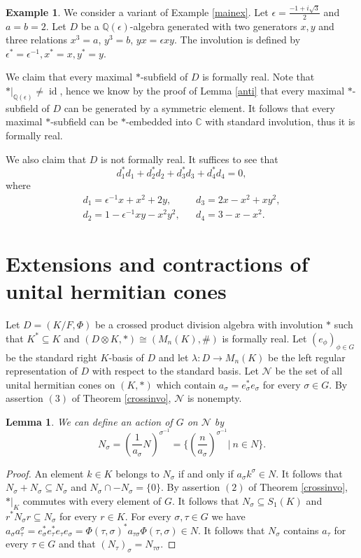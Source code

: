 \documentclass[12pt,reqno]{amsart}
\newtheorem{lem}[thm]{Lemma}
\theoremstyle{definition}
\newtheorem{ex}{Example}
\providecommand{\CC}{\mathbb{C}}
\providecommand{\QQ}{\mathbb{Q}}
\providecommand{\eps}{\epsilon}
\DeclareMathOperator{\id}{id}
\begin{document}
\begin{ex} 
\label{mainexvar}
We consider a variant of Example \ref{mainex}. Let $\epsilon = \frac{-1+i\sqrt{3}}{2}$
and $a=b=2$. Let $D$ be a $\QQ(\eps)$-algebra generated with two generators $x, y$ 
and three relations $x^3=a$, $y^3=b$, $yx=\epsilon xy$. 
The involution is defined by $\eps^\ast=\eps^{-1},x^\ast=x,y^\ast=y$. 

We claim that every maximal $\ast$-subfield of $D$ is formally real. Note that 
$\ast|_{\QQ(\eps)} \ne \id$, hence we know by the proof of Lemma \ref{anti}
that every maximal $\ast$-subfield of $D$ can be generated by a symmetric element.
It follows that every maximal $\ast$-subfield can be $\ast$-embedded into
$\CC$ with standard involution, thus it is formally real.

We also claim that $D$ is not formally real. It suffices to see that
\[
d_1^\ast d_1+d_2^\ast d_2+d_3^\ast d_3+d_4^\ast d_4=0,
\]
where
\[
\begin{array}{lll}
d_1 = \eps^{-1} x+x^2+ 2 y, & & d_3 = 2x-x^2+x y^2, \\
d_2 = 1- \eps^{-1} x y - x^2 y^2, & & d_4 = 3-x-x^2.
\end{array}
\]
\end{ex}



\section{Extensions and contractions of unital hermitian cones}


Let $D=(K/F,\Phi)$ be a crossed product division algebra with involution $\ast$
such that $K^\ast \subseteq K$ and $(D \otimes K,\ast) \cong (M_n(K),\#)$ is formally real. 
Let $(e_\phi)_{\phi \in G}$ be the standard right $K$-basis of $D$ and let 
$\lambda \colon D \to M_n(K)$ be the left regular representation of $D$ with respect to 
the standard basis. Let $\mathcal{N}$ be the set of all unital hermitian cones on $(K,\ast)$ 
which contain $a_\sigma = e_\sigma^\ast e_\sigma$ for every $\sigma \in G$. 
By assertion $(3)$ of Theorem \ref{crossinvo}, $\mathcal{N}$ is nonempty.

\begin{lem}
We can define an action of $G$ on $\mathcal{N}$ by 
\[
N_\sigma = \left(\frac{1}{a_\sigma} N \right)^{\sigma^{-1}}
= \{\left(\frac{n}{a_\sigma}\right)^{\sigma^{-1}} \! \vert \ n \in N\}.
\]
\end{lem}
\begin{proof} An element $k \in K$ belongs to $N_\sigma$ if and only if 
$a_\sigma k^\sigma \in N$. It follows that $N_\sigma+N_\sigma \subseteq N_\sigma$ 
and $N_\sigma \cap -N_\sigma=\{0\}$. By assertion $(2)$ of Theorem \ref{crossinvo},
$\ast|_K$ commutes with every element of $G$. It follows that $N_\sigma \subseteq S_1(K)$
and $r^\ast N_\sigma r \subseteq N_\sigma$ for every $r \in K$. For every $\sigma, \tau \in G$
we have $a_\sigma a_\tau^\sigma = e_\sigma^\ast e_\tau^\ast e_\tau e_\sigma =
\Phi(\tau,\sigma)^\ast a_{\tau \sigma} \Phi(\tau,\sigma) \in N$. It follows that $N_\sigma$
contains $a_\tau$ for every $\tau \in G$ and that $(N_\tau)_\sigma=N_{\tau \sigma}$.
\end{proof}
\end{document}
